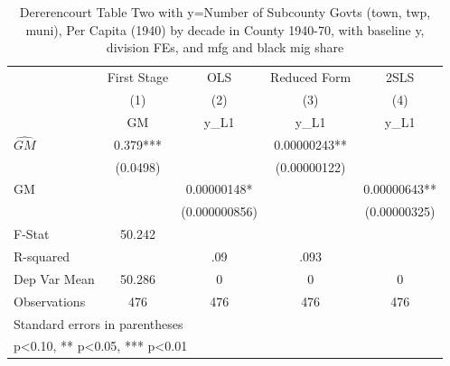 \begin{table}[htbp]\centering
\def\sym#1{\ifmmode^{#1}\else\(^{#1}\)\fi}
\caption{Dererencourt Table Two with y=Number of Subcounty Govts (town, twp, muni), Per Capita (1940) by decade in County 1940-70, with baseline y, division FEs, and mfg and black mig share}
\begin{tabular}{l*{4}{c}}
\toprule
                    & First Stage   &         OLS   &Reduced Form   &        2SLS   \\
                    &\multicolumn{1}{c}{(1)}&\multicolumn{1}{c}{(2)}&\multicolumn{1}{c}{(3)}&\multicolumn{1}{c}{(4)}\\
                    &\multicolumn{1}{c}{GM}&\multicolumn{1}{c}{y\_L1}&\multicolumn{1}{c}{y\_L1}&\multicolumn{1}{c}{y\_L1}\\
\midrule
$\hat{GM}$          &       0.379***&               &  0.00000243** &               \\
                    &    (0.0498)   &               &(0.00000122)   &               \\
\addlinespace
GM                  &               &  0.00000148*  &               &  0.00000643** \\
                    &               &(0.000000856)   &               &(0.00000325)   \\
\midrule
F-Stat              &      50.242   &               &               &               \\
R-squared           &               &         .09   &        .093   &               \\
Dep Var Mean        &      50.286   &           0   &           0   &           0   \\
Observations        &         476   &         476   &         476   &         476   \\
\bottomrule
\multicolumn{5}{l}{\footnotesize Standard errors in parentheses}\\
\multicolumn{5}{l}{\footnotesize * p<0.10, ** p<0.05, *** p<0.01}\\
\end{tabular}
\end{table}

